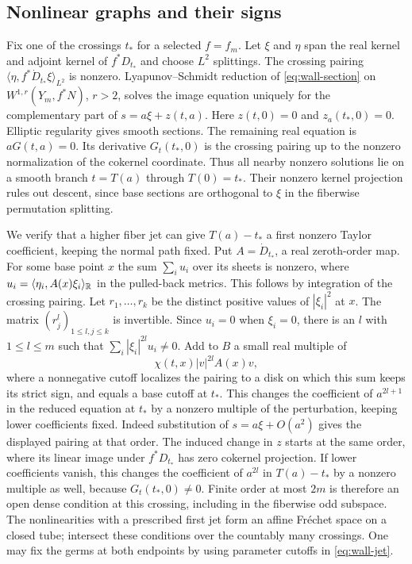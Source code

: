 \subsection*{Nonlinear graphs and their signs}
Fix one of the crossings $t_*$ for a selected $f=f_m$. Let $\xi$ and
$\eta$ span the real kernel and adjoint kernel of $f^*D_{t_*}$ and
choose $L^2$ splittings. The crossing pairing
$\langle\eta, f^*\dot D_{t_*}\xi\rangle_{L^2}$ is nonzero.
Lyapunov--Schmidt reduction of \eqref{eq:wall-section} on
$W^{1,r}(Y_m,f^*N)$, $r>2$, solves the image equation uniquely for
the complementary part of $s=a\xi+z(t,a)$. Here $z(t,0)=0$ and
$z_a(t_*,0)=0$. Elliptic regularity gives smooth sections. The
remaining real equation is $aG(t,a)=0$. Its derivative $G_t(t_*,0)$
is the crossing pairing up to the nonzero normalization of the
cokernel coordinate. Thus all nearby nonzero solutions lie on a
smooth branch $t=T(a)$ through $T(0)=t_*$. Their nonzero kernel
projection rules out descent, since base sections are orthogonal to
$\xi$ in the fiberwise permutation splitting.

We verify that a higher fiber jet can give $T(a)-t_*$ a first nonzero
Taylor coefficient, keeping the normal path fixed. Put
$A=\dot D_{t_*}$, a real zeroth-order map. For some base point $x$
the sum $\sum_i u_i$ over its sheets is nonzero, where
$u_i=\langle\eta_i,A(x)\xi_i\rangle_{\mathbb R}$ in the pulled-back
metrics. This follows by integration of the crossing pairing. Let
$r_1,\ldots,r_k$ be the distinct positive values of $|\xi_i|^2$ at
$x$. The matrix $(r_j^l)_{1\le l,j\le k}$ is invertible. Since
$u_i=0$ when $\xi_i=0$, there is an $l$ with $1\le l\le m$ such that
$\sum_i |\xi_i|^{2l}u_i\ne0$. Add to $B$ a small real multiple of
\begin{equation}\label{eq:wall-jet}
        \chi(t,x)|v|^{2l} A(x)v,
\end{equation}
where a nonnegative cutoff localizes the pairing to a disk on which
this sum keeps its strict sign, and equals a base cutoff at $t_*$.
This changes the coefficient of $a^{2l+1}$ in the reduced equation
at $t_*$ by a nonzero multiple of the perturbation, keeping lower
coefficients fixed. Indeed substitution of $s=a\xi+O(a^2)$ gives
the displayed pairing at that order. The induced change in $z$ starts
at the same order, where its linear image under $f^*D_{t_*}$ has
zero cokernel projection. If lower coefficients vanish, this changes
the coefficient of $a^{2l}$ in $T(a)-t_*$ by a nonzero multiple as
well, because $G_t(t_*,0)\ne0$. Finite order at most $2m$ is
therefore an open dense condition at this crossing, including in the
fiberwise odd subspace. The nonlinearities with a prescribed first
jet form an affine Fr\'echet space on a closed tube; intersect these
conditions over the countably many crossings. One may fix the germs
at both endpoints by using parameter cutoffs in \eqref{eq:wall-jet}.

